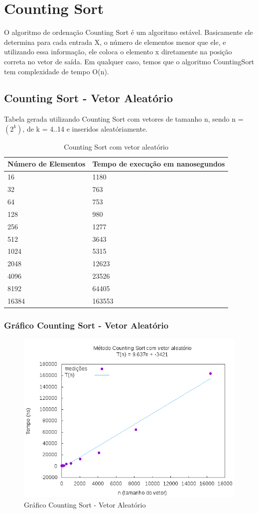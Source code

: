 \documentclass[12pt,a4paper,twoside]{report}
\begin{document}
\chapter{Counting Sort}
O algoritmo de ordenação Counting Sort é um algoritmo estável. Basicamente ele determina para cada entrada X, o número de elementos menor que ele, e utilizando essa informação, ele coloca o elemento x diretamente na posição correta no vetor de saída.
Em qualquer caso, temos que o algoritmo CountingSort tem complexidade de tempo O(n).

\section{Counting Sort - Vetor Aleatório}
Tabela gerada utilizando Counting Sort com vetores de tamanho n, sendo n = $(2^k)$, de k = 4..14 e inseridos aleatóriamente.
\begin{table}[H]
\centering
\caption{Counting Sort com vetor aleatório}
\label{my-label}
\begin{tabular}{|l|l|}
\hline
\multicolumn{1}{|c|}{\textbf{Número de Elementos}} & \multicolumn{1}{c|}{\textbf{Tempo de execução em nanosegundos}} \\ \hline
16 & 1180 \\ \hline
32 & 763 \\ \hline
64 & 753 \\ \hline
128 & 980 \\ \hline
256 & 1277 \\ \hline
512 & 3643 \\ \hline
1024 & 5315 \\ \hline
2048 & 12623 \\ \hline
4096 & 23526 \\ \hline
8192 & 64405 \\ \hline
16384 & 163553 \\ \hline
\end{tabular}
\end{table}

\subsection{Gráfico Counting Sort - Vetor Aleatório}
\begin{figure}[H]
    \centering
    \includegraphics[width=0.7\linewidth]{graficos/CountingSort/vIntAleatorio/vIntAleatorio.png}
  \caption{Gráfico Counting Sort - Vetor Aleatório}
\end{figure}
\end{document}
